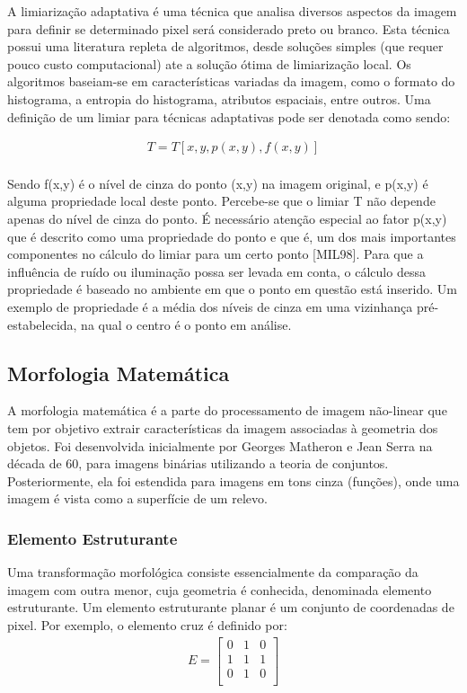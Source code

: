\documentclass[letterpaper, 10 pt, conference]{ieeeconf}  %
\begin{document}
A limiarização adaptativa é uma técnica que analisa diversos aspectos da imagem
para definir se determinado pixel será considerado preto ou branco. Esta técnica
possui uma literatura repleta de algoritmos, desde soluções simples (que requer
pouco custo computacional) ate a solução ótima de limiarização local. Os
algoritmos baseiam-se em características variadas da imagem, como o formato do
histograma, a entropia do histograma, atributos espaciais, entre outros. Uma
definição de um limiar para técnicas adaptativas pode ser denotada como sendo:

\begin{align}
T=T[x,y,p(x,y),f(x,y)]
\end{align}
\\Sendo f(x,y) é o nível de cinza do ponto (x,y) na imagem original, e p(x,y) é
alguma propriedade local deste ponto. Percebe-se que o limiar T não depende
apenas do nível de cinza do ponto. É necessário atenção especial ao fator p(x,y) que
é descrito como uma propriedade do ponto e que é, um dos mais importantes
componentes no cálculo do limiar para um certo ponto [MIL98]. Para que a influência
de ruído ou iluminação possa ser levada em conta, o cálculo dessa propriedade é
baseado no ambiente em que o ponto em questão está inserido. Um exemplo de
propriedade é a média dos níveis de cinza em uma vizinhança pré-estabelecida, na
qual o centro é o ponto em análise.


\subsection{Morfologia Matemática}

A morfologia matemática é a parte do processamento de imagem não-linear que tem
por objetivo extrair características da imagem associadas à geometria dos
objetos. Foi desenvolvida inicialmente por Georges Matheron e Jean Serra na
década de 60, para imagens binárias utilizando a teoria de conjuntos.
Posteriormente, ela foi estendida para imagens em tons cinza (funções),
onde uma imagem é vista como a superfície de um relevo.\\

\subsubsection{Elemento Estruturante}

Uma transformação morfológica consiste essencialmente da comparação da imagem
com outra menor, cuja geometria é conhecida, denominada elemento estruturante.
Um elemento estruturante planar é um conjunto de coordenadas de pixel. Por
exemplo, o elemento cruz é definido por:
\begin{align}
E = 
\begin{bmatrix}
 0 & 1 & 0 \\
 1 & 1 & 1 \\
 0 & 1 & 0 \\
 \end{bmatrix}
\end{align}
\end{document}

